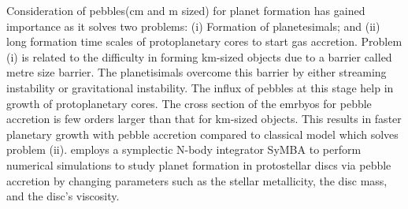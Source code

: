  Consideration of pebbles(cm and m sized) for planet formation has gained importance as it solves two problems: (i) Formation of planetesimals; and (ii) long formation time scales of protoplanetary cores to start gas accretion. Problem (i) is related to the difficulty in forming km-sized objects due to a barrier called metre size barrier. The planetisimals overcome this barrier by either streaming instability or gravitational instability. The influx of pebbles at this stage help in growth of protoplanetary cores. The cross section of the emrbyos for pebble accretion is few orders larger than that for km-sized objects. This results in faster planetary growth with pebble accretion compared to classical model which solves problem (ii).\cite{refId0} employs a symplectic N-body integrator SyMBA to perform numerical simulations to study planet formation in protostellar discs via pebble accretion by changing parameters such as the stellar metallicity, the disc mass, and the disc’s viscosity.
